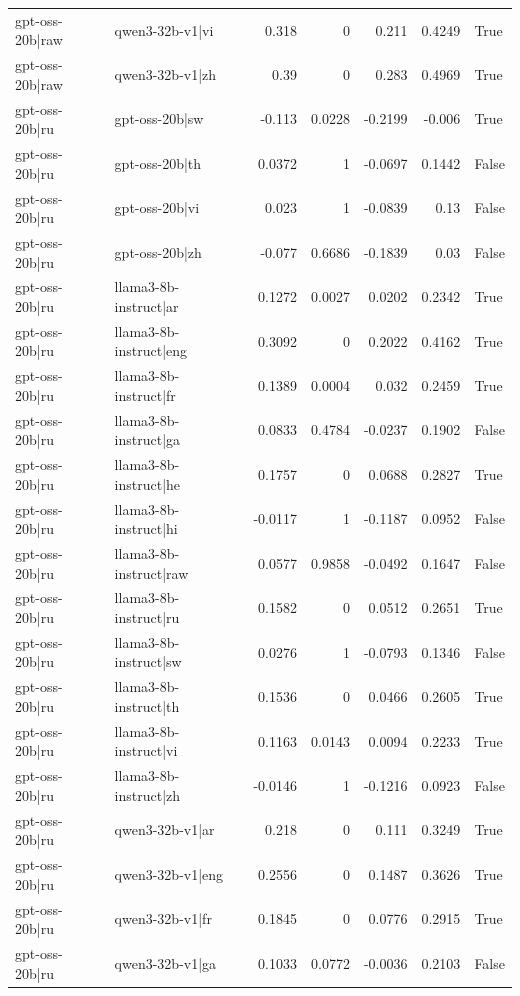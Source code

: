 \begin{table}
\begin{tabular}{l l r r r r l}
gpt-oss-20b|raw & qwen3-32b-v1|vi & 0.318 & 0 & 0.211 & 0.4249 & True \\
gpt-oss-20b|raw & qwen3-32b-v1|zh & 0.39 & 0 & 0.283 & 0.4969 & True \\
gpt-oss-20b|ru & gpt-oss-20b|sw & -0.113 & 0.0228 & -0.2199 & -0.006 & True \\
gpt-oss-20b|ru & gpt-oss-20b|th & 0.0372 & 1 & -0.0697 & 0.1442 & False \\
gpt-oss-20b|ru & gpt-oss-20b|vi & 0.023 & 1 & -0.0839 & 0.13 & False \\
gpt-oss-20b|ru & gpt-oss-20b|zh & -0.077 & 0.6686 & -0.1839 & 0.03 & False \\
gpt-oss-20b|ru & llama3-8b-instruct|ar & 0.1272 & 0.0027 & 0.0202 & 0.2342 & True \\
gpt-oss-20b|ru & llama3-8b-instruct|eng & 0.3092 & 0 & 0.2022 & 0.4162 & True \\
gpt-oss-20b|ru & llama3-8b-instruct|fr & 0.1389 & 0.0004 & 0.032 & 0.2459 & True \\
gpt-oss-20b|ru & llama3-8b-instruct|ga & 0.0833 & 0.4784 & -0.0237 & 0.1902 & False \\
gpt-oss-20b|ru & llama3-8b-instruct|he & 0.1757 & 0 & 0.0688 & 0.2827 & True \\
gpt-oss-20b|ru & llama3-8b-instruct|hi & -0.0117 & 1 & -0.1187 & 0.0952 & False \\
gpt-oss-20b|ru & llama3-8b-instruct|raw & 0.0577 & 0.9858 & -0.0492 & 0.1647 & False \\
gpt-oss-20b|ru & llama3-8b-instruct|ru & 0.1582 & 0 & 0.0512 & 0.2651 & True \\
gpt-oss-20b|ru & llama3-8b-instruct|sw & 0.0276 & 1 & -0.0793 & 0.1346 & False \\
gpt-oss-20b|ru & llama3-8b-instruct|th & 0.1536 & 0 & 0.0466 & 0.2605 & True \\
gpt-oss-20b|ru & llama3-8b-instruct|vi & 0.1163 & 0.0143 & 0.0094 & 0.2233 & True \\
gpt-oss-20b|ru & llama3-8b-instruct|zh & -0.0146 & 1 & -0.1216 & 0.0923 & False \\
gpt-oss-20b|ru & qwen3-32b-v1|ar & 0.218 & 0 & 0.111 & 0.3249 & True \\
gpt-oss-20b|ru & qwen3-32b-v1|eng & 0.2556 & 0 & 0.1487 & 0.3626 & True \\
gpt-oss-20b|ru & qwen3-32b-v1|fr & 0.1845 & 0 & 0.0776 & 0.2915 & True \\
gpt-oss-20b|ru & qwen3-32b-v1|ga & 0.1033 & 0.0772 & -0.0036 & 0.2103 & False \\

\end{tabular}
\end{table}

